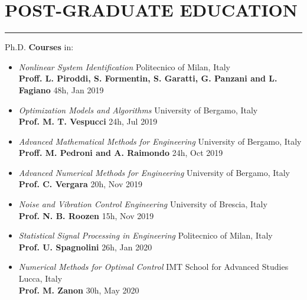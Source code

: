 \documentclass[10pt]{article}
\newcommand{\cvsection}[1]{\section*{\centering\normalsize\uppercase{#1}}\vspace{-16pt}\rule{\linewidth}{0.2pt}\vspace{6pt}}
\begin{document}
\cvsection{post-graduate education}
Ph.D. \textbf{Courses} in:
\begin{itemize}	
	\setlength\itemsep{-3pt}
	\renewcommand\labelitemi{$\vcenter{\hbox{\tiny$\bullet$}}$}

	\item \textit{Nonlinear System Identification} \hfill Politecnico of Milan, Italy\\
	\textbf{Proff. L. Piroddi, S. Formentin, S. Garatti, G. Panzani and L. Fagiano} \hfill 48h, Jan 2019\\
	
	\item \textit{Optimization Models and Algorithms} \hfill University of Bergamo, Italy\\
	\textbf{Prof. M. T. Vespucci} \hfill 24h, Jul 2019\\
	 
	\item \textit{Advanced Mathematical Methods for Engineering} \hfill University of Bergamo, Italy\\
	\textbf{Proff. M. Pedroni and A. Raimondo} \hfill 24h, Oct 2019\\
	 
	\item \textit{Advanced Numerical Methods for Engineering} \hfill University of Bergamo, Italy\\
	\textbf{Prof. C. Vergara} \hfill 20h, Nov 2019\\
	 

	\item \textit{Noise and Vibration Control Engineering} \hfill University of Brescia, Italy\\
	\textbf{Prof. N. B. Roozen} \hfill 15h, Nov 2019\\
	
	\item \textit{Statistical Signal Processing in Engineering} \hfill Politecnico of Milan, Italy\\
	\textbf{Prof. U. Spagnolini} \hfill 26h, Jan 2020\\
	 
	\item \textit{Numerical Methods for Optimal Control} \hfill IMT School for Advanced Studies Lucca, Italy\\
	\textbf{Prof. M. Zanon} \hfill 30h, May 2020\\
	

\end{itemize}
\end{document}
